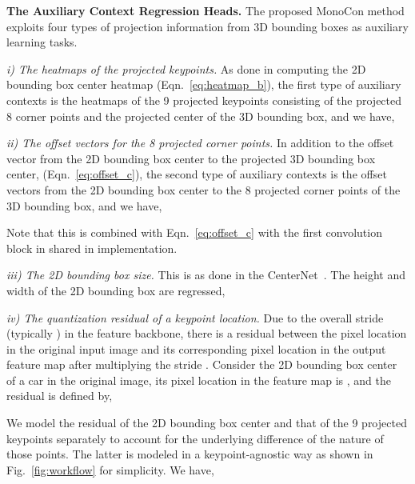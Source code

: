 \documentclass[letterpaper]{article} \usepackage{aaai22}  \usepackage{times}  \usepackage{helvet}  \usepackage{courier}  \usepackage[hyphens]{url}  \usepackage{graphicx} \urlstyle{rm} \def\UrlFont{\rm}  \usepackage{natbib}  \usepackage{caption} \DeclareCaptionStyle{ruled}{labelfont=normalfont,labelsep=colon,strut=off} \frenchspacing  \setlength{\pdfpagewidth}{8.5in}  \setlength{\pdfpageheight}{11in}  \usepackage{algorithm}
\begin{document}
\textbf{The Auxiliary Context Regression Heads.} 
The proposed MonoCon method exploits four types of projection information from 3D bounding boxes as auxiliary learning tasks. 

\textit{i) The heatmaps of the projected keypoints.} As done in computing the 2D bounding box center heatmap  (Eqn.~\ref{eq:heatmap_b}), the first type of auxiliary contexts is the heatmaps of the 9 projected keypoints consisting of the projected 8 corner points and the projected center of the 3D bounding box, and we have, 


\textit{ii) The offset vectors for the 8 projected corner points.} In addition to the offset vector from the 2D bounding box center to the projected 3D bounding box center,  (Eqn.~\ref{eq:offset_c}), the second type of auxiliary contexts is the offset vectors from the 2D bounding box center to the 8 projected corner points of the 3D bounding box, and we have, 

Note that this is combined with Eqn.~\ref{eq:offset_c} with the first convolution block in  shared in implementation. 

\textit{iii) The 2D bounding box size.} This is as done in the CenterNet~\cite{centernet}. The height and width of the 2D bounding box are regressed, 


\textit{iv) The quantization residual of a keypoint location.} Due to the overall stride  (typically ) in the feature backbone, there is a residual between the pixel location in the original input image  and its corresponding  pixel location in the output feature map  after multiplying the stride . Consider the 2D bounding box center  of a car in the original image, its pixel location in the feature map  is , and the residual is defined by, 

We model the residual of the 2D bounding box center  and that of the 9 projected keypoints  separately to account for the underlying difference of the nature of those points. The latter is modeled in a keypoint-agnostic way as shown in Fig.~\ref{fig:workflow} for simplicity. We have, 
\end{document}
